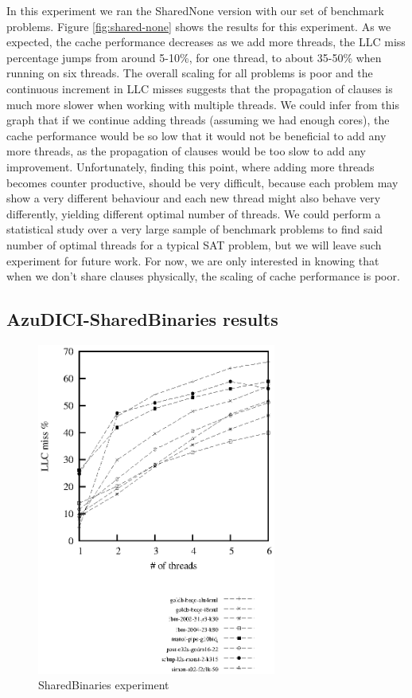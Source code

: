 \documentclass[12pt]{diicc}
\begin{document}
In this experiment we ran the SharedNone version with our set of benchmark problems. Figure \ref{fig:shared-none} shows the results for this experiment. As we expected, the cache performance decreases as we add more threads, the LLC miss percentage jumps from around 5-10\%, for one thread, to about 35-50\% when running on six threads. The overall scaling for all problems is poor and the continuous increment in LLC misses suggests that the propagation of clauses is much more slower when working with multiple threads. We could infer from this graph that if we continue adding threads (assuming we had enough cores), the cache performance would be so low that it would not be beneficial to add any more threads, as the propagation of clauses would be too slow to add any improvement. Unfortunately, finding this point, where adding more threads becomes counter productive, should be very difficult, because each problem may show a very different behaviour and each new thread might also behave very differently, yielding different optimal number of threads. We could perform a statistical study over a very large sample of benchmark problems to find said number of optimal threads for a typical SAT problem, but we will leave such experiment for future work. For now, we are only interested in knowing that when we don't share clauses physically, the scaling of cache performance is poor.

\subsection{AzuDICI-SharedBinaries results}

\begin{figure}[h!]
	\centering
		\includegraphics[width=0.7\textwidth]{shared-binaries}
	\caption{SharedBinaries experiment}
	\label{fig:shared-binaries}
\end{figure}
\end{document}
